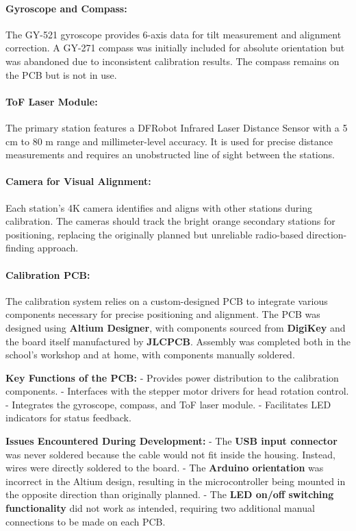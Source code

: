 \paragraph{Gyroscope and Compass:}
The GY-521 gyroscope provides 6-axis data for tilt measurement and alignment correction. A GY-271 compass was initially included for absolute orientation but was abandoned due to inconsistent calibration results. The compass remains on the PCB but is not in use.

\paragraph{ToF Laser Module:}
The primary station features a DFRobot Infrared Laser Distance Sensor with a 5 cm to 80 m range and millimeter-level accuracy. It is used for precise distance measurements and requires an unobstructed line of sight between the stations.

\paragraph{Camera for Visual Alignment:}
Each station’s 4K camera identifies and aligns with other stations during calibration. The cameras should track the bright orange secondary stations for positioning, replacing the originally planned but unreliable radio-based direction-finding approach.

\paragraph{Calibration PCB:}
The calibration system relies on a custom-designed PCB to integrate various components necessary for precise positioning and alignment. The PCB was designed using \textbf{Altium Designer}, with components sourced from \textbf{DigiKey} and the board itself manufactured by \textbf{JLCPCB}. Assembly was completed both in the school’s workshop and at home, with components manually soldered.

\textbf{Key Functions of the PCB:}
- Provides power distribution to the calibration components.
- Interfaces with the stepper motor drivers for head rotation control.
- Integrates the gyroscope, compass, and ToF laser module.
- Facilitates LED indicators for status feedback.

\textbf{Issues Encountered During Development:}
- The \textbf{USB input connector} was never soldered because the cable would not fit inside the housing. Instead, wires were directly soldered to the board.
- The \textbf{Arduino orientation} was incorrect in the Altium design, resulting in the microcontroller being mounted in the opposite direction than originally planned.
- The \textbf{LED on/off switching functionality} did not work as intended, requiring two additional manual connections to be made on each PCB.

